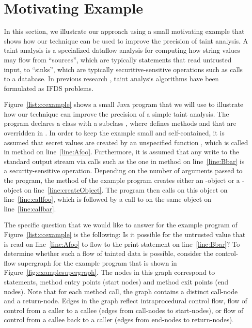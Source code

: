 \section{Motivating Example}
  \label{sec:MotivatingExample}
  
In this section, we illustrate our approach using a small motivating example that
shows how our technique can be used to improve the precision of taint analysis.
A taint analysis is a specialized dataflow analysis for computing how string values
may flow from ``sources'', which are typically statements that read untrusted input, 
to ``sinks'', which are typically securitive-sensitive operations such as calls to 
a database. In previous research , taint analysis algorithms have been 
formulated as IFDS problems.     
  

  
Figure~\ref{list:ccexample} shows a small Java program that we will use to illustrate
how our technique can improve the precision of a simple taint analysis. The program
declares a class  with a subclass ,  where  defines methods 
 and  that are overridden in .  In order to keep the 
example small and self-contained, it is assumed  that secret values are created by 
an unspecified function , which is called in method  on 
line~\ref{line:Afoo}. Furthermore, it is assumed that any write to the standard output 
stream via calls  such as the one in method  
on line~\ref{line:Bbar} is a security-sensitive operation. Depending on the number of 
arguments passed to the program, the  method of the example program creates 
either an -object or a -object on line~\ref{line:createObject}. The 
program then calls  on this object on line~\ref{line:callfoo}, which is 
followed by a call to  on the same object on line~\ref{line:callbar}.  
 
The specific question that we would like to answer for the example program of
Figure~\ref{list:ccexample} is the following: Is it possible for the untrusted value 
that is read on line~\ref{line:Afoo} to flow to the print statement on line~\ref{line:Bbar}? 
%
To determine whether such a flow of tainted data is possible, consider the control-flow
supergraph for the example program that is shown in Figure~\ref{fig:examplesupergraph}.
 The nodes in this graph correspond to statements, method entry points (start nodes) and 
method exit points (end nodes). Note that for each method call, the graph contains a 
distinct call-node and a return-node. Edges in the graph reflect intraprocedural control flow, 
flow of control from a caller to a callee (edges from call-nodes to start-nodes), or
flow of control from a callee back to a caller (edges from end-nodes to return-nodes). 

